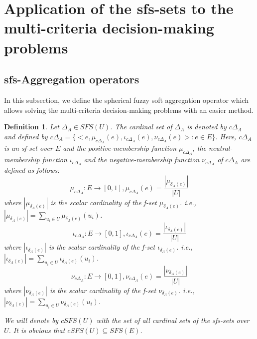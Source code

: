 \documentclass{IJFS}
\newtheorem{definition}[theorem]{Definition}
\begin{document}
\section{Application of the sfs-sets to the multi-criteria decision-making
problems}
\subsection{sfs-Aggregation operators}

In this subsection, we define the spherical fuzzy soft aggregation
operator which allows solving the multi-criteria decision-making problems with an
easier method.
\begin{definition}
Let $\Delta_A \in SFS(U)$. The cardinal set of $\Delta_A$ is
denoted by $c\Delta_A$ and defined by \linebreak[4] $c\Delta_A=\{
<e,\mu_{c\Delta_A}(e), \iota_{c\Delta_A}(e), \nu_{c\Delta_A}(e)>:
e\in E\}$. Here, $c\Delta_A$ is an sf-set over $E$ and the
positive-membership function $\mu_{c\Delta_A}$, the
neutral-membership function $\iota_{c\Delta_A}$ and the
negative-membership function $\nu_{c\Delta_A}$ of $c\Delta_A$ are
defined as follows:
\begin{equation} \label{c1}
\mu_{c\Delta_A}:E\to [0,1],
\mu_{c\Delta_A}(e)=\frac{|\mu_{\delta_A(e)}|}{|U|}
\end{equation}
where $|\mu_{\delta_A(e)}|$ is the scalar cardinality of the f-set $\mu_{\delta_A(e)}$. i.e.,
$|\mu_{\delta_A(e)}|=\sum_{u_i\in U} \mu_{\delta_A(e)}(u_i)$.
\begin{equation} \label{c2}
\iota_{c\Delta_A}:E\to [0,1],
\iota_{c\Delta_A}(e)=\frac{|\iota_{\delta_A(e)}|}{|U|}
\end{equation}
where $|\iota_{\delta_A(e)}|$ is the scalar cardinality of the
f-set $\iota_{\delta_A(e)}$. i.e.,
$|\iota_{\delta_A(e)}|=\sum_{u_i\in U} \iota_{\delta_A(e)}(u_i)$.
\begin{equation} \label{c3}
\nu_{c\Delta_A}:E\to [0,1],
\nu_{c\Delta_A}(e)=\frac{|\nu_{\delta_A(e)}|}{|U|}
\end{equation}
where $|\nu_{\delta_A(e)}|$ is the scalar cardinality of the f-set
$\nu_{\delta_A(e)}$. i.e., $|\nu_{\delta_A(e)}|=\sum_{u_i\in U}
\nu_{\delta_A(e)}(u_i)$.

We will denote by $cSFS(U)$ with the set of all cardinal sets of
the sfs-sets over $U$. It is obvious that $cSFS(U) \subseteq
SFS(E)$.
\end{definition}
\end{document}
